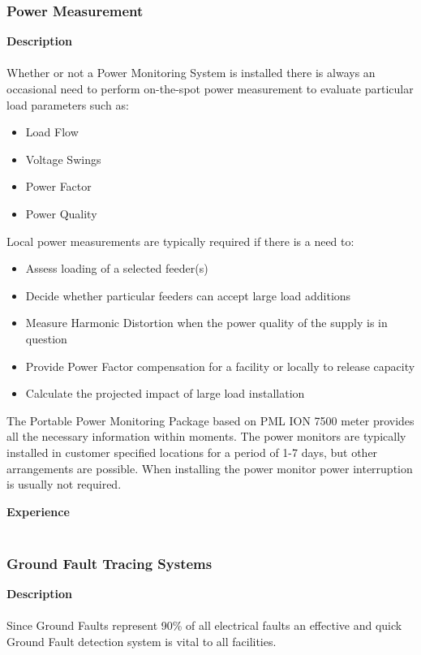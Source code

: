 \subsubsection{Power Measurement}
\label{Sub:Exp:PowM}

\textbf{Description}\\
\\
Whether or not a Power Monitoring System is installed there is always an occasional need to perform on-the-spot power measurement to evaluate particular load parameters such as:
\begin{itemize}
	\item Load Flow
	\item Voltage Swings
	\item Power Factor
	\item Power Quality
\end{itemize}
Local power measurements are typically required if there is a need to:
\begin{itemize}
	\item Assess loading of a selected feeder(s)
	\item Decide whether particular feeders can accept large load additions
	\item Measure Harmonic Distortion when the power quality of the supply is in question
	\item Provide Power Factor compensation for a facility or locally to release capacity
	\item Calculate the projected impact of large load installation
\end{itemize}

The Portable Power Monitoring Package based on PML ION 7500 meter provides all the necessary information within moments. The power monitors are typically installed in customer specified locations for a period of 1-7 days, but other arrangements are possible. When installing the power monitor power interruption is usually not required.

\textbf{Experience}\\
\\	

\subsubsection{Ground Fault Tracing Systems}
\label{Sub:Exp:SR}

\textbf{Description}\\
\\
Since Ground Faults represent 90\% of all electrical faults an effective and quick Ground Fault detection system is vital to all facilities. 

